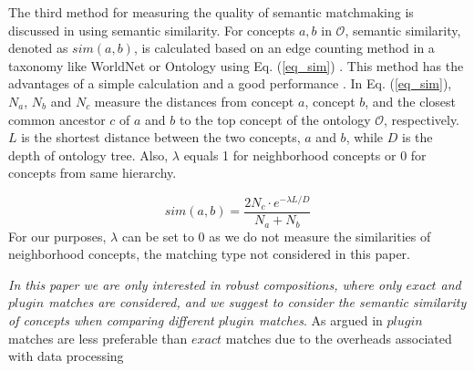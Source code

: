 The third method for measuring the quality of semantic matchmaking is discussed in \cite{shet2012new} using semantic similarity. For concepts $a, b$ in $\mathcal{O}$, semantic similarity, denoted as $sim(a, b)$, is calculated based on an edge counting method in a taxonomy like WorldNet or Ontology using Eq. (\ref{eq_sim}) \cite{shet2012new}. This method has the advantages of a simple calculation and a good performance . In Eq. (\ref{eq_sim}), $N_a$, $N_b$ and $N_c$ measure the distances from concept $a$, concept $b$, and the closest common ancestor $c$ of $a$ and $b$ to the top concept of the ontology $\mathcal{O}$, respectively.  $L$ is the shortest distance between the two concepts, $a$ and $b$, while $D$ is the depth of ontology tree. Also, $\lambda$ equals 1 for neighborhood concepts or 0 for concepts from same hierarchy.

\begin{equation}
sim(a, b){=} \frac{2N_c \cdot e^{-\lambda L/D} }{N_{a}+N_{b}}
\label{eq_sim}
\end{equation}
\noindent For our purposes, $\lambda$ can be set to 0 as we do not measure the similarities of neighborhood concepts, the matching type not considered in this paper. 

\emph{In this paper we are only interested in robust compositions, where only $exact$ and $plugin$ matches are considered, and we suggest to consider the semantic similarity of concepts when comparing different $plugin$ matches}. As argued in \cite{lecue2009optimizing} $plugin$ matches are less preferable than $exact$ matches due to the overheads associated with data processing


